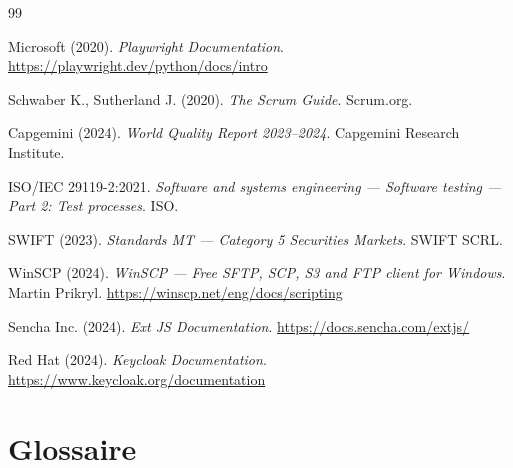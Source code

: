 \documentclass[12pt, a4paper]{report}
\begin{document}
\begin{thebibliography}{99}

Microsoft (2020). \textit{Playwright Documentation}. \url{https://playwright.dev/python/docs/intro}

Schwaber K., Sutherland J. (2020). \textit{The Scrum Guide}. Scrum.org.

Capgemini (2024). \textit{World Quality Report 2023–2024}. Capgemini Research Institute.

ISO/IEC 29119-2:2021. \textit{Software and systems engineering — Software testing — Part 2: Test processes}. ISO.

SWIFT (2023). \textit{Standards MT — Category 5 Securities Markets}. SWIFT SCRL.

WinSCP (2024). \textit{WinSCP — Free SFTP, SCP, S3 and FTP client for Windows}. Martin Prikryl. \url{https://winscp.net/eng/docs/scripting}

Sencha Inc. (2024). \textit{Ext JS Documentation}. \url{https://docs.sencha.com/extjs/}

Red Hat (2024). \textit{Keycloak Documentation}. \url{https://www.keycloak.org/documentation}

\end{thebibliography}

\chapter*{Glossaire}
\end{document}
